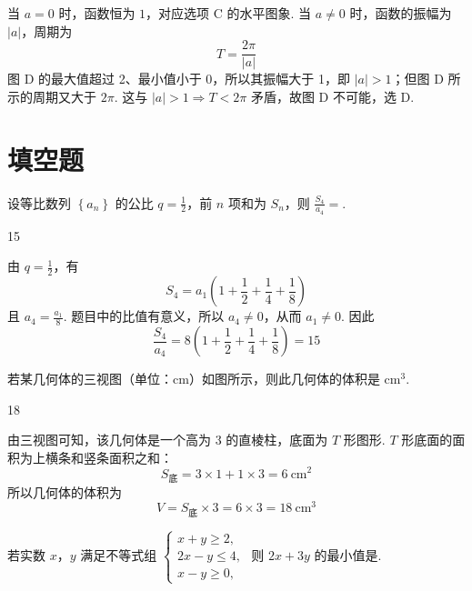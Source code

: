 \begin{solution}
当 \(a=0\) 时，函数恒为 \(1\)，对应选项 C 的水平图象.
当 \(a\neq0\) 时，函数的振幅为 \(|a|\)，周期为
\[
T=\frac{2\pi}{|a|}
\]
图 D 的最大值超过 2、最小值小于 0，所以其振幅大于 1，即
\(|a|>1\)；但图 D 所示的周期又大于 \(2\pi\). 这与
\(|a|>1\Rightarrow T<2\pi\) 矛盾，故图 D 不可能，选 D.
\end{solution}

\section{填空题}

\begin{problem}
设等比数列 \(\left\{a_{n}\right\}\) 的公比 \(q = \frac{1}{2}\)，前 \(n\) 项和为 \(S_{n}\)，则 \(\frac{S_{4}}{a_{4}} = \)\fillinblank{}.
\end{problem}

\begin{answer}
15
\end{answer}

\begin{solution}
由 \(q=\frac12\)，有
\[
S_4=a_1\left(1+\frac12+\frac14+\frac18\right)
\]
且 \(a_4=\frac{a_1}{8}\).
题目中的比值有意义，所以 \(a_4\ne0\)，从而 \(a_1\ne0\).
因此
\[
\frac{S_4}{a_4}=8\left(1+\frac12+\frac14+\frac18\right)=15
\]
\end{solution}

\begin{problem}
若某几何体的三视图（单位：\(\mathrm{cm}\)）如图所示，则此几何体的体积是\fillinblank{} \(\mathrm{cm}^{3}\).

\end{problem}

\begin{answer}
18
\end{answer}

\begin{solution}
由三视图可知，该几何体是一个高为 \(3\) 的直棱柱，底面为 \(T\) 形图形.
\(T\) 形底面的面积为上横条和竖条面积之和：
\[
S_{\text{底}}=3\times1+1\times3=6\ \mathrm{cm}^{2}
\]
所以几何体的体积为
\[
V=S_{\text{底}}\times3=6\times3=18\ \mathrm{cm}^{3}
\]
\end{solution}

\begin{problem}
若实数 \(x\)，\(y\) 满足不等式组 \(\begin{cases}
x + y \geqslant 2,\\
2x - y \leqslant 4,\\
x - y \geqslant 0,
\end{cases}\) 则 \(2x + 3y\) 的最小值是\fillinblank{}.
\end{problem}

